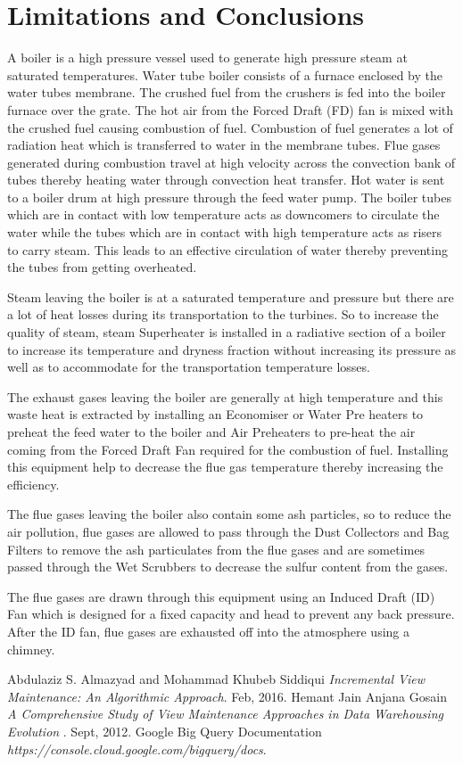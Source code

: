 \documentclass[12pt]{report}
\begin{document}
\section{Limitations and Conclusions}
A boiler is a high pressure vessel used to generate high pressure steam at saturated temperatures. Water tube boiler consists of a furnace enclosed by the water tubes membrane. The crushed fuel from the crushers is fed into the boiler furnace over the grate. The hot air from the Forced Draft (FD) fan is mixed with the crushed fuel causing combustion of fuel.
Combustion of fuel generates a lot of radiation heat which is transferred to water in the membrane tubes. Flue gases generated during combustion travel at high velocity across the convection bank of tubes thereby heating water through convection heat transfer. Hot water is sent to a boiler drum at high pressure through the feed water pump. The boiler tubes which are in contact with low temperature acts as downcomers to circulate the water while the tubes which are in contact with high temperature acts as risers to carry steam. This leads to an effective circulation of water thereby preventing the tubes from getting overheated.

Steam leaving the boiler is at a saturated temperature and pressure but there are a lot of heat losses during its transportation to the turbines. So to increase the quality of steam, steam Superheater is installed in a radiative section of a boiler to increase its temperature and dryness fraction without increasing its pressure as well as to accommodate for the transportation temperature losses.

The exhaust gases leaving the boiler are generally at high temperature and this waste heat is extracted by installing an Economiser or Water Pre heaters to preheat the feed water to the boiler and Air Preheaters to pre-heat the air coming from the Forced Draft Fan required for the combustion of fuel. Installing this equipment help to decrease the flue gas temperature thereby increasing the efficiency.

The flue gases leaving the boiler also contain some ash particles, so to reduce the air pollution, flue gases are allowed to pass through the Dust Collectors and Bag Filters to remove the ash particulates from the flue gases and are sometimes passed through the Wet Scrubbers to decrease the sulfur content from the gases.

The flue gases are drawn through this equipment using an Induced Draft (ID) Fan which is designed for a fixed capacity and head to prevent any back pressure. After the ID fan, flue gases are exhausted off into the atmosphere using a chimney.
\\ 
\begin{thebibliography}{999}
Abdulaziz S. Almazyad and Mohammad Khubeb Siddiqui\emph{ Incremental View Maintenance: An Algorithmic 
Approach}.
 	 Feb, 2016.
Hemant Jain Anjana Gosain \emph{A Comprehensive Study of View Maintenance Approaches in Data Warehousing Evolution }.
 	 Sept, 2012. 	 
Google Big Query Documentation \emph{https://console.cloud.google.com/bigquery/docs}.
\end{thebibliography}
\end{document}
